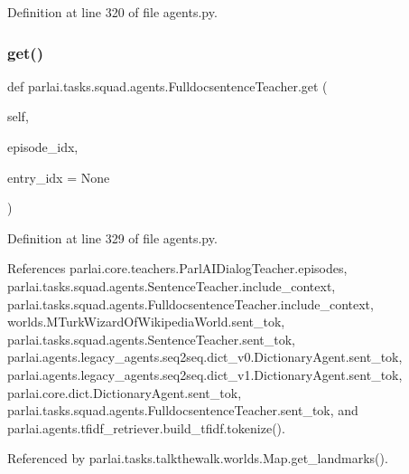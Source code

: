 Definition at line 320 of file agents.\+py.

\mbox{\label{classparlai_1_1tasks_1_1squad_1_1agents_1_1FulldocsentenceTeacher_a60f31f40d228baf2a27eb4e1e2e1c213}} 
\subsubsection{\texorpdfstring{get()}{get()}}
{\footnotesize\ttfamily def parlai.\+tasks.\+squad.\+agents.\+Fulldocsentence\+Teacher.\+get (\begin{DoxyParamCaption}\item[{}]{self,  }\item[{}]{episode\+\_\+idx,  }\item[{}]{entry\+\_\+idx = {\ttfamily None} }\end{DoxyParamCaption})}



Definition at line 329 of file agents.\+py.



References parlai.\+core.\+teachers.\+Parl\+A\+I\+Dialog\+Teacher.\+episodes, parlai.\+tasks.\+squad.\+agents.\+Sentence\+Teacher.\+include\+\_\+context, parlai.\+tasks.\+squad.\+agents.\+Fulldocsentence\+Teacher.\+include\+\_\+context, worlds.\+M\+Turk\+Wizard\+Of\+Wikipedia\+World.\+sent\+\_\+tok, parlai.\+tasks.\+squad.\+agents.\+Sentence\+Teacher.\+sent\+\_\+tok, parlai.\+agents.\+legacy\+\_\+agents.\+seq2seq.\+dict\+\_\+v0.\+Dictionary\+Agent.\+sent\+\_\+tok, parlai.\+agents.\+legacy\+\_\+agents.\+seq2seq.\+dict\+\_\+v1.\+Dictionary\+Agent.\+sent\+\_\+tok, parlai.\+core.\+dict.\+Dictionary\+Agent.\+sent\+\_\+tok, parlai.\+tasks.\+squad.\+agents.\+Fulldocsentence\+Teacher.\+sent\+\_\+tok, and parlai.\+agents.\+tfidf\+\_\+retriever.\+build\+\_\+tfidf.\+tokenize().



Referenced by parlai.\+tasks.\+talkthewalk.\+worlds.\+Map.\+get\+\_\+landmarks().

